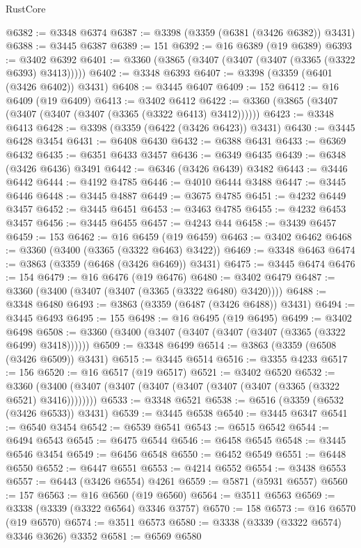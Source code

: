 \begin{lexlean}{RustCore}
\begin{coremodule}
@6382 := @3348 @6374
@6387 := @3398 (@3359 (@6381 (@3426 @6382)) @3431)
@6388 := @3445 @6387
@6389 := 151
@6392 := @16 @6389 (@19 @6389)
@6393 := @3402 @6392
@6401 := @3360 (@3865 (@3407 (@3407 (@3407 (@3365 (@3322 @6393) @3413)))))
@6402 := @3348 @6393
@6407 := @3398 (@3359 (@6401 (@3426 @6402)) @3431)
@6408 := @3445 @6407
@6409 := 152
@6412 := @16 @6409 (@19 @6409)
@6413 := @3402 @6412
@6422 := @3360 (@3865 (@3407 (@3407 (@3407 (@3407 (@3365 (@3322 @6413) @3412))))))
@6423 := @3348 @6413
@6428 := @3398 (@3359 (@6422 (@3426 @6423)) @3431)
@6430 := @3445 @6428 @3454
@6431 := @6408 @6430
@6432 := @6388 @6431
@6433 := @6369 @6432
@6435 := @6351 @6433 @3457
@6436 := @6349 @6435
@6439 := @6348 (@3426 @6436) @3491
@6442 := @6346 (@3426 @6439) @3482
@6443 := @3446 @6442
@6444 := @4192 @4785
@6446 := @4010 @6444 @3488
@6447 := @3445 @6446
@6448 := @3445 @4887
@6449 := @3675 @4785
@6451 := @4232 @6449 @3457
@6452 := @3445 @6451
@6453 := @3463 @4785
@6455 := @4232 @6453 @3457
@6456 := @3445 @6455
@6457 := @4243 @44
@6458 := @3439 @6457
@6459 := 153
@6462 := @16 @6459 (@19 @6459)
@6463 := @3402 @6462
@6468 := @3360 (@3400 (@3365 (@3322 @6463) @3422))
@6469 := @3348 @6463
@6474 := @3863 (@3359 (@6468 (@3426 @6469)) @3431)
@6475 := @3445 @6474
@6476 := 154
@6479 := @16 @6476 (@19 @6476)
@6480 := @3402 @6479
@6487 := @3360 (@3400 (@3407 (@3407 (@3365 (@3322 @6480) @3420))))
@6488 := @3348 @6480
@6493 := @3863 (@3359 (@6487 (@3426 @6488)) @3431)
@6494 := @3445 @6493
@6495 := 155
@6498 := @16 @6495 (@19 @6495)
@6499 := @3402 @6498
@6508 := @3360 (@3400 (@3407 (@3407 (@3407 (@3407 (@3365 (@3322 @6499) @3418))))))
@6509 := @3348 @6499
@6514 := @3863 (@3359 (@6508 (@3426 @6509)) @3431)
@6515 := @3445 @6514
@6516 := @3355 @4233
@6517 := 156
@6520 := @16 @6517 (@19 @6517)
@6521 := @3402 @6520
@6532 := @3360 (@3400 (@3407 (@3407 (@3407 (@3407 (@3407 (@3407 (@3365 (@3322 @6521) @3416))))))))
@6533 := @3348 @6521
@6538 := @6516 (@3359 (@6532 (@3426 @6533)) @3431)
@6539 := @3445 @6538
@6540 := @3445 @6347
@6541 := @6540 @3454
@6542 := @6539 @6541
@6543 := @6515 @6542
@6544 := @6494 @6543
@6545 := @6475 @6544
@6546 := @6458 @6545
@6548 := @3445 @6546 @3454
@6549 := @6456 @6548
@6550 := @6452 @6549
@6551 := @6448 @6550
@6552 := @6447 @6551
@6553 := @4214 @6552
@6554 := @3438 @6553
@6557 := @6443 (@3426 @6554) @4261
@6559 := @5871 (@5931 @6557)
@6560 := 157
@6563 := @16 @6560 (@19 @6560)
@6564 := @3511 @6563
@6569 := @3338 (@3339 (@3322 @6564) @3346 @3757)
@6570 := 158
@6573 := @16 @6570 (@19 @6570)
@6574 := @3511 @6573
@6580 := @3338 (@3339 (@3322 @6574) @3346 @3626) @3352
@6581 := @6569 @6580

\end{coremodule}
\end{lexlean}
